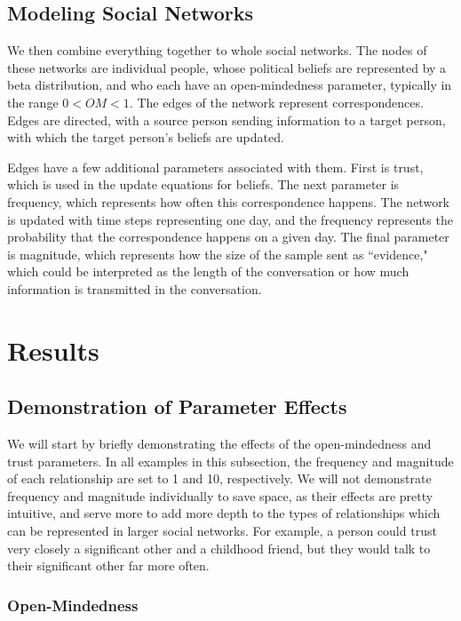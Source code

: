 \documentclass[11pt]{article}
\begin{document}

\subsection{Modeling Social Networks}

We then combine everything together to whole social networks. The nodes of these networks are individual people, whose political beliefs are represented by a beta distribution, and who each have an open-mindedness parameter, typically in the range $0<OM<1$. The edges of the network represent correspondences. Edges are directed, with a source person sending information to a target person, with which the target person's beliefs are updated.

Edges have a few additional parameters associated with them. First is trust, which is used in the update equations for beliefs. The next parameter is frequency, which represents how often this correspondence happens. The network is updated with time steps representing one day, and the frequency represents the probability that the correspondence happens on a given day. The final parameter is magnitude, which represents how the size of the sample sent as ``evidence," which could be interpreted as the length of the conversation or how much information is transmitted in the conversation.

\section{Results}

\subsection{Demonstration of Parameter Effects}

We will start by briefly demonstrating the effects of the open-mindedness and trust parameters. In all examples in this subsection, the frequency and magnitude of each relationship are set to 1 and 10, respectively. We will not demonstrate frequency and magnitude individually to save space, as their effects are pretty intuitive, and serve more to add more depth to the types of relationships which can be represented in larger social networks. For example, a person could trust very closely a significant other and a childhood friend, but they would talk to their significant other far more often.

\subsubsection{Open-Mindedness}
\end{document}
